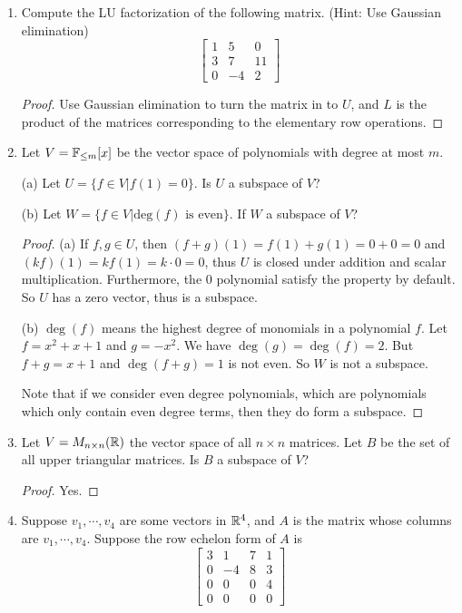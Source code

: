 \documentclass{amsart}
\begin{document}
	
\vspace{2em}

\begin{enumerate}
\item Compute the LU factorization of the following matrix. (Hint: Use Gaussian elimination)
\[\begin{bmatrix}
	1&5&0\\3&7&11\\0&-4&2
\end{bmatrix}\]
\begin{proof}{\color{blue}
	Use Gaussian elimination to turn the matrix in to $U$, and $L$ is the product of the matrices corresponding to the elementary row operations.}
\end{proof}
\item Let $V=\mathbb{F}_{\leq m}[x]$ be the vector space of polynomials with degree at most $m$. 

(a) Let $U=\{f\in V|f(1)=0\}$. Is $U$ a subspace of $V$?

(b) Let $W=\{f\in V| \text{deg}(f)\text{ is even}\}$. If $W$ a subspace of $V$?
\begin{proof}\color{blue}
	(a) If $f,g\in U$, then $(f+g)(1)=f(1)+g(1)=0+0=0$ and $(kf)(1)=kf(1)=k\cdot 0 =0$, thus $U$ is closed under addition and scalar multiplication. Furthermore, the $0$ polynomial satisfy the property by default. So $U$ has a zero vector, thus is a subspace.
	
	(b) $\deg(f)$ means the highest degree of monomials in a polynomial $f$. Let $f=x^2+x+1$ and $g=-x^2$. We have $\deg(g)=\deg(f)=2$. But $f+g=x+1$ and $\deg(f+g)=1$ is not even. So $W$ is not a subspace.
	
	Note that if we consider even degree polynomials, which are polynomials which only contain even degree terms, then they do form a subspace.
	\end{proof}
\item Let $V=M_{n\times n}(\mathbb{R})$ the vector space of all $n\times n$ matrices. Let $B$ be the set of all upper triangular matrices. Is $B$ a subspace of $V$?
\begin{proof}
	\color{blue} Yes.
\end{proof}
\item Suppose $v_1,\cdots,v_4$ are some vectors in $\mathbb{R}^4$, and $A$ is the matrix whose columns are $v_1,\cdots,v_4$. Suppose the row echelon form of $A$ is
\[\begin{bmatrix}
	3&1&7&1\\0&-4&8&3\\0&0&0&4\\0&0&0&0
\end{bmatrix}\]


\end{enumerate}
\end{document}

